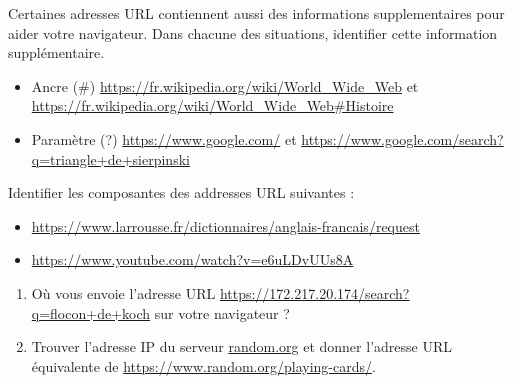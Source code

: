 \documentclass{article}
\begin{document}
\begin{enumquestions}
\item Certaines adresses URL contiennent aussi des informations supplementaires pour aider votre navigateur. Dans chacune des situations, identifier cette information supplémentaire.
\begin{itemize}
\item Ancre (\#) \url{https://fr.wikipedia.org/wiki/World_Wide_Web} et \url{https://fr.wikipedia.org/wiki/World_Wide_Web#Histoire}

\answersline

\answersline
\item Paramètre (?) \url{https://www.google.com/} et \url{https://www.google.com/search?q=triangle+de+sierpinski}

\answersline

\answersline
\end{itemize}
\item Identifier les composantes des addresses URL suivantes :
\begin{itemize}
\item \url{https://www.larrousse.fr/dictionnaires/anglais-francais/request}

\answersline
\item \url{https://www.youtube.com/watch?v=e6uLDvUUs8A}

\answersline
\end{itemize}
\item 
\begin{enumerate}
\item Où vous envoie l'adresse URL \url{https://172.217.20.174/search?q=flocon+de+koch} sur votre navigateur ?
\item Trouver l'adresse IP du serveur \url{random.org} et donner l'adresse URL équivalente de \url{https://www.random.org/playing-cards/}. 
\end{enumerate}
\end{enumquestions}
\newpage
\end{document}
